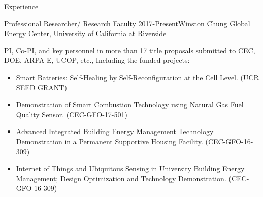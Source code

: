 \documentclass{resume} %
\begin{document}
\begin{rSection}{ Experience}
\begin{rSubsection}{Professional Researcher/  Research Faculty}{ 2017-Present}{Winston Chung Global Energy Center, University of California at Riverside}{}
   \item  []  PI,  Co-PI, and key personnel in more than 17 title proposals submitted to CEC, DOE, ARPA-E, UCOP, etc., Including the funded projects:
   \begin{itemize}
  \item  [] Smart Batteries: Self-Healing by Self-Reconfiguration at the Cell Level. (UCR SEED GRANT)
  \item [] Demonstration of Smart Combustion Technology using Natural Gas Fuel Quality Sensor. (CEC-GFO-17-501)
  \item [] Advanced Integrated Building Energy Management Technology Demonstration in a Permanent Supportive Housing Facility. (CEC-GFO-16-309)
  \item [] Internet of Things and Ubiquitous Sensing in University Building Energy Management; Design Optimization and Technology Demonstration. (CEC-GFO-16-309)
  
\end{itemize}
   
   
   
   
\end{rSubsection}



%
%
%
%
%





\end{rSection}
\end{document}
